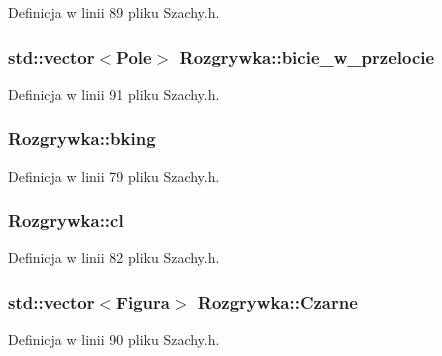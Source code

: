 \-Definicja w linii 89 pliku \-Szachy.\-h.

\hypertarget{class_rozgrywka_ac57c5275261e3c1091c6ff0c5dff1bb4}{
\subsubsection[{bicie\-\_\-w\-\_\-przelocie}]{\setlength{\rightskip}{0pt plus 5cm}std\-::vector$<${\bf \-Pole}$>$ {\bf \-Rozgrywka\-::bicie\-\_\-w\-\_\-przelocie}}}\label{class_rozgrywka_ac57c5275261e3c1091c6ff0c5dff1bb4}


\-Definicja w linii 91 pliku \-Szachy.\-h.

\hypertarget{class_rozgrywka_a5d791226219e1d9f6b4d7b4a321a217c}{
\subsubsection[{bking}]{ {\bf \-Rozgrywka\-::bking}}}\label{class_rozgrywka_a5d791226219e1d9f6b4d7b4a321a217c}


\-Definicja w linii 79 pliku \-Szachy.\-h.

\hypertarget{class_rozgrywka_ae5873496f515f96320fa604d23708966}{
\subsubsection[{cl}]{ {\bf \-Rozgrywka\-::cl}}}\label{class_rozgrywka_ae5873496f515f96320fa604d23708966}


\-Definicja w linii 82 pliku \-Szachy.\-h.

\hypertarget{class_rozgrywka_a36ee2fc7f160a08fd58afd0b8c5c297f}{
\subsubsection[{\-Czarne}]{\setlength{\rightskip}{0pt plus 5cm}std\-::vector$<${\bf \-Figura}$>$ {\bf \-Rozgrywka\-::\-Czarne}}}\label{class_rozgrywka_a36ee2fc7f160a08fd58afd0b8c5c297f}


\-Definicja w linii 90 pliku \-Szachy.\-h.

